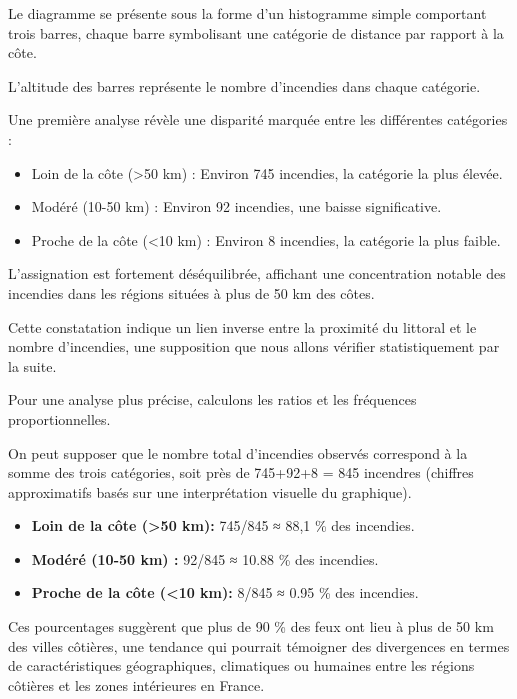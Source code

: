 \documentclass[
]{article}
\providecommand{\tightlist}{%
  \setlength{\itemsep}{0pt}\setlength{\parskip}{0pt}}
\begin{document}
Le diagramme se présente sous la forme d'un histogramme simple
comportant trois barres, chaque barre symbolisant une catégorie de
distance par rapport à la côte.

L'altitude des barres représente le nombre d'incendies dans chaque
catégorie.

Une première analyse révèle une disparité marquée entre les différentes
catégories :

\begin{itemize}
\tightlist
\item
  Loin de la côte (\textgreater50 km) : Environ 745 incendies, la
  catégorie la plus élevée.
\item
  Modéré (10-50 km) : Environ 92 incendies, une baisse significative.
\item
  Proche de la côte (\textless10 km) : Environ 8 incendies, la catégorie
  la plus faible.
\end{itemize}

L'assignation est fortement déséquilibrée, affichant une concentration
notable des incendies dans les régions situées à plus de 50 km des
côtes.

Cette constatation indique un lien inverse entre la proximité du
littoral et le nombre d'incendies, une supposition que nous allons
vérifier statistiquement par la suite.

Pour une analyse plus précise, calculons les ratios et les fréquences
proportionnelles.

On peut supposer que le nombre total d'incendies observés correspond à
la somme des trois catégories, soit près de 745+92+8 = 845 incendres
(chiffres approximatifs basés sur une interprétation visuelle du
graphique).

\begin{itemize}
\tightlist
\item
  \textbf{Loin de la côte (\textgreater50 km):} 745/845 ≈ 88,1 \% des
  incendies.
\item
  \textbf{Modéré (10-50 km) :} 92/845 ≈ 10.88 \% des incendies.
\item
  \textbf{Proche de la côte (\textless10 km):} 8/845 ≈ 0.95 \% des
  incendies.
\end{itemize}

Ces pourcentages suggèrent que plus de 90 \% des feux ont lieu à plus de
50 km des villes côtières, une tendance qui pourrait témoigner des
divergences en termes de caractéristiques géographiques, climatiques ou
humaines entre les régions côtières et les zones intérieures en France.
\end{document}
